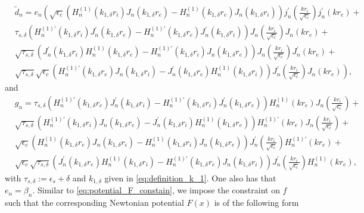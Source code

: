 \documentclass[11pt,reqno,twoside]{amsart}
\theoremstyle{definition}
\theoremstyle{remark}
\numberwithin{equation}{section}
\begin{document}
\begin{equation}
  \begin{split}
   & \tilde{d}_n= e_n \left( \sqrt{\epsilon_c} \left(H_n^{(1)}(k_{1,\delta}r_i)J_n(k_{1,\delta}r_e)- H_n^{(1)}(k_{1,\delta}r_e)J_n(k_{1,\delta}r_i)\right) j_n^{\prime}(\frac{kr_i}{\sqrt{\epsilon_c}})j_n^{\prime}(kr_e) + \right. \\
    & \tau_{s,\delta}\left( H_n^{(1)\prime}(k_{1,\delta}r_i)J_n^{\prime}(k_{1,\delta}r_e) -H_n^{(1)\prime}(k_{1,\delta}r_e)J_n^{\prime}(k_{1,\delta}r_i) \right) J_n(\frac{kr_i}{\sqrt{\epsilon_c}})J_n(kr_e) + \\
    & \sqrt{\tau_{s,\delta}}\left( J_n^{\prime}(k_{1,\delta}r_i)H_n^{(1)}(k_{1,\delta}r_e) - H_n^{(1)\prime}(k_{1,\delta}r_i)J_n(k_{1,\delta}r_e) \right) J_n(\frac{kr_i}{\sqrt{\epsilon_c}})J_n^{\prime}(kr_e) + \\
    & \left. \sqrt{\tau_{s,\delta}}\sqrt{\epsilon_c} \left( H_n^{(1)\prime}(k_{1,\delta}r_e)J_n(k_{1,\delta}r_i) - J_n^{\prime}(k_{1,\delta}r_e)H_n^{(1)}(k_{1,\delta}r_i)\right) J_n^{\prime}(\frac{kr_i}{\sqrt{\epsilon_c}})J_n(kr_e) \right),
  \end{split}
\end{equation}
and
\begin{equation}
  \begin{split}
   & g_n = \tau_{s,\delta}\left( H_n^{(1)\prime}(k_{1,\delta}r_e)J_n^{\prime}(k_{1,\delta}r_i) -H_n^{(1)\prime}(k_{1,\delta}r_i)J_n^{\prime}(k_{1,\delta}r_e) \right)H_n^{(1)}(kr_e) J_n(\frac{kr_i}{\sqrt{\epsilon_c}}) +  \\
      & \sqrt{\tau_{s,\delta}}\left(H_n^{(1)\prime}(k_{1,\delta}r_i)J_n(k_{1,\delta}r_e)  -J_n^{\prime}(k_{1,\delta}r_i) H_n^{(1)}(k_{1,\delta}r_e) \right)H_n^{(1)\prime}(kr_e) J_n(\frac{kr_i}{\sqrt{\epsilon_c}}) + \\
      & \sqrt{\epsilon_c}\left( H_n^{(1)}(k_{1,\delta}r_e)J_n(k_{1,\delta}r_i) -H_n^{(1)}(k_{1,\delta}r_i)J_n(k_{1,\delta}r_e) \right)J_n^{\prime}(\frac{kr_i}{\sqrt{\epsilon_c}})H_n^{(1)\prime}(kr_e) + \\
      &  \sqrt{\epsilon_c}\sqrt{\tau_{s,\delta}}\left( J_n^{\prime}(k_{1,\delta}r_e) H_n^{(1)}(k_{1,\delta}r_i) - H_n^{(1)\prime}(k_{1,\delta}r_e)J_n(k_{1,\delta}r_i)    \right) J_n^{\prime}(\frac{kr_i}{\sqrt{\epsilon_c}})H_n^{(1)}(kr_e),
  \end{split}
\end{equation}
with $\tau_{s,\delta}:=\epsilon_s+\delta$ and $k_{1,\delta}$ given in \eqref{eq:definition_k_1}. One also has that $e_n=\beta_n$. Similar to \eqref{eq:potential_F_constain}, we impose the constraint on $f$ such that the corresponding Newtonian potential $F(x)$ is of the following form
\end{document}
